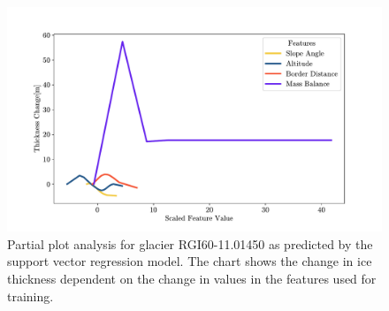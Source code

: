 \begin{figure}[!tp]
	\centering		  
	\includegraphics[width=1.\textwidth]{figures/SVR_low_thick_pdp.pdf}
	\caption{Partial plot analysis for glacier RGI60-11.01450 as predicted by the support vector regression model. The chart shows the change in ice thickness dependent on the change in values in the features used for training.}
	\label{fig:svr-pdp-low-thick}
\end{figure}

